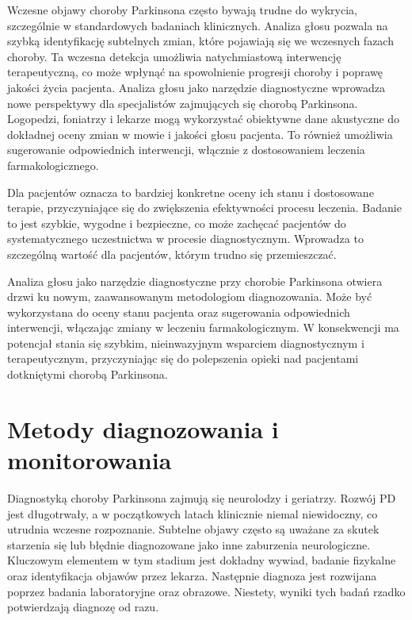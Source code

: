 Wczesne objawy choroby Parkinsona często bywają trudne do wykrycia, szczególnie w standardowych badaniach klinicznych.
Analiza głosu pozwala na szybką identyfikację subtelnych zmian, które pojawiają się we wczesnych fazach choroby.
Ta wczesna detekcja umożliwia natychmiastową interwencję terapeutyczną, co może wpłynąć na spowolnienie progresji choroby i poprawę jakości życia pacjenta.
Analiza głosu jako narzędzie diagnostyczne wprowadza nowe perspektywy dla specjalistów zajmujących się chorobą Parkinsona.
Logopedzi, foniatrzy i lekarze mogą wykorzystać obiektywne dane akustyczne do dokładnej oceny zmian w mowie i jakości głosu pacjenta.
To również umożliwia sugerowanie odpowiednich interwencji, włącznie z dostosowaniem leczenia farmakologicznego.

Dla pacjentów oznacza to bardziej konkretne oceny ich stanu i dostosowane terapie, przyczyniające się do zwiększenia efektywności procesu leczenia.
Badanie to jest szybkie, wygodne i bezpieczne, co może zachęcać pacjentów do systematycznego uczestnictwa w procesie diagnostycznym.
Wprowadza to szczególną wartość dla pacjentów, którym trudno się przemieszczać.

Analiza głosu jako narzędzie diagnostyczne przy chorobie Parkinsona otwiera drzwi ku nowym, zaawansowanym metodologiom diagnozowania.
Może być wykorzystana do oceny stanu pacjenta oraz sugerowania odpowiednich interwencji, włączając zmiany w leczeniu farmakologicznym.
W konsekwencji ma potencjał stania się szybkim, nieinwazyjnym wsparciem diagnostycznym i terapeutycznym, przyczyniając się do polepszenia
opieki nad pacjentami dotkniętymi chorobą Parkinsona.

\section{Metody diagnozowania i monitorowania}
\label{sec:diagnostyka}

Diagnostyką choroby Parkinsona zajmują się neurolodzy i geriatrzy.
Rozwój PD jest długotrwały, a w początkowych latach klinicznie niemal niewidoczny, co utrudnia wczesne rozpoznanie.
Subtelne objawy często są uważane za skutek starzenia się lub błędnie diagnozowane jako inne zaburzenia neurologiczne.
Kluczowym elementem w tym stadium jest dokładny wywiad, badanie fizykalne oraz identyfikacja objawów przez lekarza.
Następnie diagnoza jest rozwijana poprzez badania laboratoryjne oraz obrazowe.
Niestety, wyniki tych badań rzadko potwierdzają diagnozę od razu.


